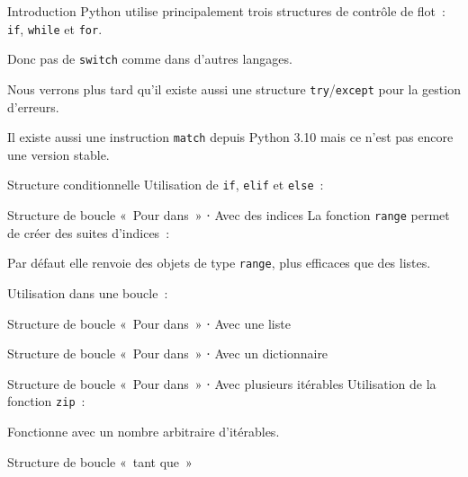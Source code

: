 \begin{frame}{Introduction}
  Python utilise principalement trois structures de contrôle de flot~: \texttt{if}, \texttt{while} et \texttt{for}.

  Donc pas de \texttt{switch} comme dans d'autres langages.

  Nous  verrons plus tard qu'il existe aussi une structure \texttt{try}/\texttt{except} pour la gestion d'erreurs.

  Il existe aussi une instruction \texttt{match} depuis Python 3.10 mais ce n'est pas encore une version stable.
\end{frame}

\begin{frame}{Structure conditionnelle}
  Utilisation de \texttt{if}, \texttt{elif} et \texttt{else}~:
\end{frame}

\begin{frame}{Structure de boucle «~Pour dans~» ⋅ Avec des indices}
  La fonction \texttt{range} permet de créer des suites d'indices~:


  Par défaut elle renvoie des objets de type \texttt{range}, plus efficaces que des listes.

  Utilisation dans une boucle~:

\end{frame}

\begin{frame}{Structure de boucle «~Pour dans~» ⋅ Avec une liste}
\end{frame}

\begin{frame}{Structure de boucle «~Pour dans~» ⋅ Avec un dictionnaire}
\end{frame}

\begin{frame}{Structure de boucle «~Pour dans~» ⋅ Avec plusieurs itérables}
  Utilisation de la fonction \texttt{zip}~:


  Fonctionne avec un nombre arbitraire d'itérables.
\end{frame}

\begin{frame}{Structure de boucle «~tant que~»}
\end{frame}

